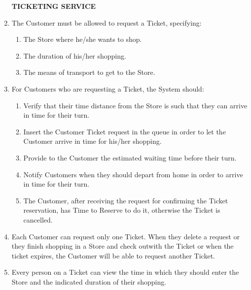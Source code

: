 \documentclass[a4paper, 12pt, oneside]{article}
\begin{document}
\begin{enumerate}[align=left, label={R.\arabic{*}}]
    \item[\textbf{TICKETING SERVICE}]
    \item \label{req:requestTicket} The Customer must be allowed to request a Ticket, specifying:
     \begin{enumerate}[label={-}]
        \item \label{req:requestTicket:store} The Store where he/she wants to shop.
        \item \label{req:requestTicket:duration}The duration of his/her shopping.
        \item \label{req:requestTicket:transport}The means of transport to get to the Store.
    \end{enumerate}
    \item \label{req:systemTicket}For Customers who are requesting a Ticket, the System should:
    \begin{enumerate}[label={-}]
        \item \label{req:systemTicket:verifyDist} Verify that their time distance from the Store is such that they can arrive in time for their turn.
        \item \label{req:systemTicket:addInQueue}Insert the Customer Ticket request in the queue in order to let the Customer arrive in time for his/her shopping.
        \item \label{req:systemTicket:waitingTime} Provide to the Customer the estimated waiting time before their turn.
        \item \label{req:systemTicket:notifForDepart} Notify Customers when they should depart from home in order to arrive in time for their turn.
        \item \label{req:systemTicket:reserveTimeout}The Customer, after receiving the request for confirming the Ticket reservation, has Time to Reserve to do it, otherwise the Ticket is cancelled.
    \end{enumerate}
    \item \label{req:numberTicketPerCust} Each Customer can request only one Ticket. When they delete a request or they finish shopping in a Store and check outwith the Ticket or when the ticket expires, the Customer will be able to request another Ticket.
    \item \label{req:codeUnique:ticketInfo}Every person on a Ticket can view the time in which they should enter the Store and the indicated duration of their shopping.
    

\end{enumerate}
\end{document}
